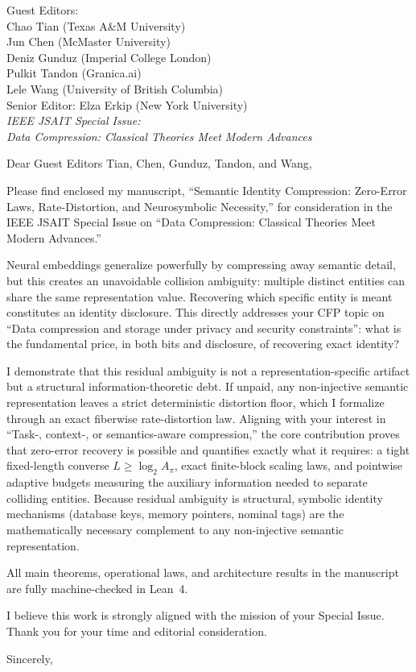\documentclass[11pt]{letter}
\date{\today}
\begin{document}
\begin{letter}{Guest Editors:\\
Chao Tian (Texas A\&M University)\\
Jun Chen (McMaster University)\\
Deniz Gunduz (Imperial College London)\\
Pulkit Tandon (Granica.ai)\\
Lele Wang (University of British Columbia)\\[1em]
Senior Editor: Elza Erkip (New York University)\\[1em]
\textit{IEEE JSAIT Special Issue:}\\
\textit{Data Compression: Classical Theories Meet Modern Advances}\\
}

\opening{Dear Guest Editors Tian, Chen, Gunduz, Tandon, and Wang,}

Please find enclosed my manuscript, ``Semantic Identity Compression: Zero-Error Laws, Rate-Distortion, and Neurosymbolic Necessity,'' for consideration in the IEEE JSAIT Special Issue on ``Data Compression: Classical Theories Meet Modern Advances.''

Neural embeddings generalize powerfully by compressing away semantic detail, but this creates an unavoidable collision ambiguity: multiple distinct entities can share the same representation value. Recovering which specific entity is meant constitutes an identity disclosure. This directly addresses your CFP topic on ``Data compression and storage under privacy and security constraints'': what is the fundamental price, in both bits and disclosure, of recovering exact identity?

I demonstrate that this residual ambiguity is not a representation-specific artifact but a structural information-theoretic debt. If unpaid, any non-injective semantic representation leaves a strict deterministic distortion floor, which I formalize through an exact fiberwise rate-distortion law. Aligning with your interest in ``Task-, context-, or semantics-aware compression,'' the core contribution proves that zero-error recovery is possible and quantifies exactly what it requires: a tight fixed-length converse $L \ge \log_2 A_\pi$, exact finite-block scaling laws, and pointwise adaptive budgets measuring the auxiliary information needed to separate colliding entities. Because residual ambiguity is structural, symbolic identity mechanisms (database keys, memory pointers, nominal tags) are the mathematically necessary complement to any non-injective semantic representation.

All main theorems, operational laws, and architecture results in the manuscript are fully machine-checked in Lean~4.

I believe this work is strongly aligned with the mission of your Special Issue. Thank you for your time and editorial consideration.

\closing{Sincerely,}

\end{letter}
\end{document}
